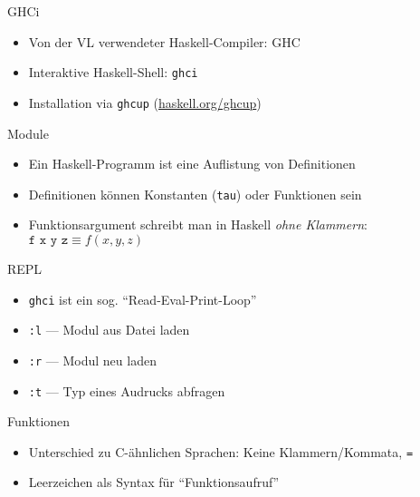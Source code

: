 \documentclass{beamer}
\begin{document}
\begin{frame}[fragile]{GHCi}

        \begin{itemize}
                \item Von der VL verwendeter Haskell-Compiler: GHC
                \item Interaktive Haskell-Shell: \texttt{ghci}
                \item Installation via \texttt{ghcup} (\href{https://www.haskell.org/ghcup/}{haskell.org/ghcup})
        \end{itemize}
\end{frame}

\begin{frame}{Module}

        \begin{itemize}
                \item Ein Haskell-Programm ist eine Auflistung von Definitionen
                \item Definitionen können Konstanten (\texttt{tau}) oder Funktionen sein
                \item Funktionsargument schreibt man in Haskell \emph{ohne Klammern}: \\
                      $\texttt{f x y z} \equiv f(x, y, z)$
        \end{itemize}
\end{frame}

\begin{frame}{REPL}

        \begin{itemize}
                \item \texttt{ghci} ist ein sog. \enquote{Read-Eval-Print-Loop}
                \item \texttt{:l} --- Modul aus Datei laden
                \item \texttt{:r} --- Modul neu laden
                \item \texttt{:t} --- Typ eines Audrucks abfragen
        \end{itemize}
\end{frame}

\begin{frame}{Funktionen}

        \begin{itemize}
                \item Unterschied zu C-ähnlichen Sprachen: Keine Klammern/Kommata, \texttt{=}
                \item Leerzeichen als Syntax für \enquote{Funktionsaufruf}
        \end{itemize}
\end{frame}
\end{document}
